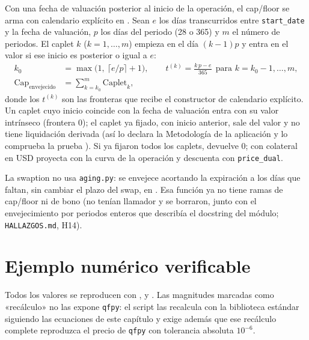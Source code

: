 Con una fecha de valuación posterior al inicio de la operación, el cap/floor se arma con calendario
explícito en . Sean $e$ los días transcurridos entre
\texttt{start\_date} y la fecha de valuación, $p$ los días del periodo (28 o 365) y $m$ el número de periodos.
El caplet $k$ ($k=1,\dots,m$) empieza en el día $(k-1)p$ y entra en el valor si ese inicio es posterior o igual
a $e$:
\begin{equation}\label{eq:cap05-envejecido}
\begin{aligned}
  k_0&=\max\bigl(1,\ \lceil e/p\rceil+1\bigr),\qquad
  t^{(k)}=\frac{k\,p-e}{365}\ \ \text{para } k=k_0-1,\dots,m,\\
  \mathrm{Cap}_{\text{envejecido}}&=\sum_{k=k_0}^{m}\mathrm{Caplet}_k,
\end{aligned}
\end{equation}
donde los $t^{(k)}$ son las fronteras que recibe el constructor de calendario explícito. Un caplet cuyo inicio
coincide con la fecha de valuación entra con su valor intrínseco (frontera $0$); el caplet ya fijado, con inicio
anterior, sale del valor y no tiene liquidación derivada (así lo declara la Metodología de la aplicación y
lo comprueba la prueba ). Si ya
fijaron todos los caplets,  devuelve 0; con colateral en USD
proyecta con la curva de la operación y descuenta con \texttt{price\_dual}.

La swaption no usa \texttt{aging.py}: se envejece acortando la expiración a los días que faltan, sin cambiar
el plazo del swap, en . Esa función ya no tiene ramas de cap/floor ni de
bono (no tenían llamador y se borraron, junto con el envejecimiento por periodos enteros que describía el docstring
del módulo; \texttt{HALLAZGOS.md}, H14).

\section{Ejemplo numérico verificable}\label{sec:cap05-ejemplo}

Todos los valores se reproducen con ,
 y
. Las magnitudes marcadas como
«recálculo» no las expone \texttt{qfpy}: el script las recalcula con la biblioteca estándar siguiendo las
ecuaciones de este capítulo y exige además que ese recálculo complete reproduzca el precio de \texttt{qfpy}
con tolerancia absoluta $10^{-6}$.

